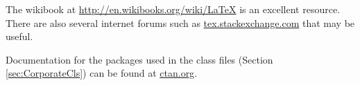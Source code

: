 The wikibook at \href{http://en.wikibooks.org/wiki/LaTeX}{http://en.wikibooks.org/wiki/LaTeX} is an excellent resource. There are also several internet forums such as \href{tex.stackexchange.com}{tex.stackexchange.com} that may be useful.

Documentation for the packages used in the class files (Section \ref{sec:CorporateCls}) can be found at \href{ctan.org}{ctan.org}.
